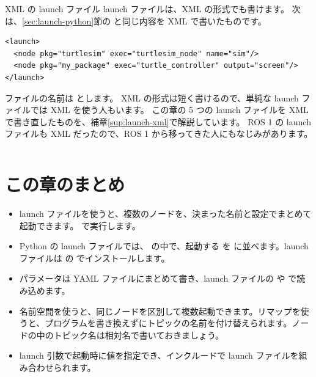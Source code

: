 \begin{column}{XML の launch ファイル}
  launch ファイルは、XML の形式でも書けます。
  次は、\ref{sec:launch-python}節の  と同じ内容を XML で書いたものです。
\begin{lstlisting}[style=xml, numbers=none, xleftmargin=0pt, framexleftmargin=0pt]
<launch>
  <node pkg="turtlesim" exec="turtlesim_node" name="sim"/>
  <node pkg="my_package" exec="turtle_controller" output="screen"/>
</launch>
\end{lstlisting}
  ファイルの名前は  とします。
  XML の形式は短く書けるので、単純な launch ファイルでは XML を使う人もいます。
  この章の 5 つの launch ファイルを XML で書き直したものを、補章\ref{sup:launch-xml}で解説しています。
  ROS 1 の launch ファイルも XML だったので、ROS 1 から移ってきた人にもなじみがあります。
\end{column}

\section*{この章のまとめ}

\begin{itemize}
  \item launch ファイルを使うと、複数のノードを、決まった名前と設定でまとめて起動できます。 で実行します。
  \item Python の launch ファイルでは、 の中で、起動する  を  に並べます。launch ファイルは  の  でインストールします。
  \item パラメータは YAML ファイルにまとめて書き、launch ファイルの  や  で読み込めます。
  \item 名前空間を使うと、同じノードを区別して複数起動できます。リマップを使うと、プログラムを書き換えずにトピックの名前を付け替えられます。ノードの中のトピック名は相対名で書いておきましょう。
  \item launch 引数で起動時に値を指定でき、インクルードで launch ファイルを組み合わせられます。
\end{itemize}
